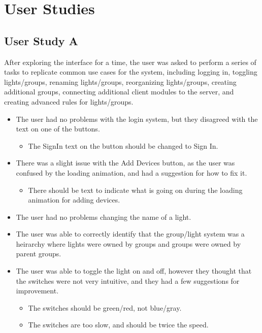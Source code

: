\documentclass[oneside,openright]{book}
\begin{document}
\section{User Studies}

\subsection{User Study A}

After exploring the interface for a time, the user was asked to perform a
series of tasks to replicate common use cases for the system, including logging
in, toggling lights/groups, renaming lights/groups, reorganizing lights/groups,
creating additional groups, connecting additional client modules to the server,
and creating advanced rules for lights/groups.

\begin{itemize}
    \item The user had no problems with the login system, but they disagreed
        with the text on one of the buttons.
        \begin{itemize}
            \item The SignIn text on the button should be changed to Sign In.
        \end{itemize}
    \item There was a slight issue with the Add Devices button, as the user was
        confused by the loading animation, and had a suggestion for how to fix
        it.
        \begin{itemize}
            \item There should be text to indicate what is going on during the
                loading animation for adding devices.
        \end{itemize}
    \item The user had no problems changing the name of a light.
    \item The user was able to correctly identify that the group/light system
        was a heirarchy where lights were owned by groups and groups were owned
        by parent groups.
    \item The user was able to toggle the light on and off, however they
        thought that the switches were not very intuitive, and they had a few
        suggestions for improvement.
        \begin{itemize}
            \item The switches should be green/red, not blue/gray.
            \item The switches are too slow, and should be twice the speed.

\end{itemize}
\end{itemize}
\end{document}

